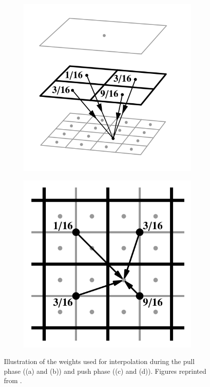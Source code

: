 \begin{figure}[htb]
\begin{subfigure}[b]{0.25\textwidth}
    \caption{}
  \end{subfigure}%
  \begin{subfigure}[b]{0.25\textwidth}
    \centering\includegraphics[width=\textwidth]{graphics/push_weights_marroquim1}
    \caption{}
  \end{subfigure}%
  \begin{subfigure}[b]{0.25\textwidth}
    \centering\includegraphics[width=\textwidth]{graphics/push_weights_marroquim2}
    \caption{}
  \end{subfigure}
  \caption{Illustration of the weights used for interpolation during the pull phase ((a) and (b)) and push phase ((c) and (d)). Figures reprinted from \citet{Marroquim:2007:reconstruction}.}
  \label{fig:concept:weights_marroquim}
\end{figure}



